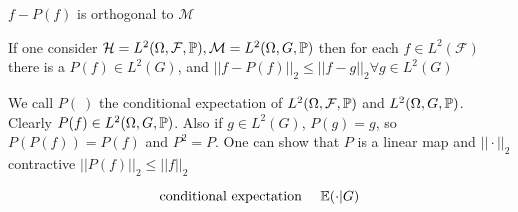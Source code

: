 $f-P(f)$ is orthogonal to $\mathcal{M}$

\bigskip

If one consider $\mathcal{H}=L^2(\Omega,\mathcal{F},\mathbb{P}),\mathcal{M}=L^2(\Omega,G,\mathbb{P})$ then for each $f\in L^2(\mathcal{F})$ there is a $P(f)\in L^2(G)$, and $||f-P(f)||_2\leq||f-g||_2\forall g\in L^2(G)$

We call $P(\:)$ the conditional expectation of $L^2(\Omega,\mathcal{F},\mathbb{P})$ and $L^2(\Omega,G,\mathbb{P})$. Clearly $P(f)\in L^2(\Omega,G,\mathbb{P})$. Also if $g \in L^2(G)$, $P(g)=g$, so $P(P(f))=P(f)$ and $P^2=P$. One can show that $P$ is a linear map and $||\cdot||_2$ contractive $||P(f)||_2\leq ||f||_2$

$$
\eqh{conditional expectation }\mathbb{E}(\cdot|G)
$$











